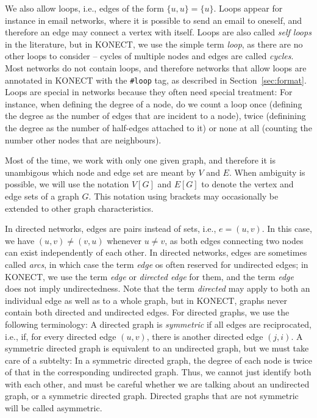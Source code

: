 \documentclass{article}
\begin{document}
We also allow loops, i.e., edges of the form $\{u,u\}=\{u\}$.  Loops
appear for instance in email networks, where it is possible to send an
email to oneself, and therefore an edge may connect a vertex with
itself.  Loops are also called \emph{self loops} in the literature, but
in KONECT, we use the simple term \emph{loop}, as there are no other
loops to consider -- cycles of multiple nodes and edges are called
\emph{cycles}. 
Most networks do not contain loops, and therefore
networks that allow loops are annotated in KONECT with the 
\texttt{\#loop} tag, as described in Section~\ref{sec:format}.  
Loops are special in networks because they often need special treatment:
For instance, when defining the degree of a node, do we count a loop
once (defining the degree as the number of edges that are incident to a
node), twice (definining the degree as the number of half-edges attached
to it) or none at all (counting the number other nodes that are
neighbours).  

Most of the time, we work with only one given graph, and therefore it is
unambigous which node and edge set are meant by $V$ and $E$.  When
ambiguity is possible, we will use the notation
$V[G]$ and $E[G]$ to denote the vertex and edge sets of a graph $G$.
This notation using brackets may occasionally be extended to other graph
characteristics. 

In directed networks, edges are pairs instead of sets, i.e.,
$e=(u,v)$.  In this case, we have $(u,v)\neq(v,u)$ whenever $u \neq v$, 
as both edges connecting two nodes can exist independently of each
other. 
In directed networks, edges are sometimes called
\emph{arcs}, in which case the term \emph{edge} os often reserved for
undirected edges; in KONECT, we use the term \emph{edge} or \emph{directed
  edge} for them, and the term \emph{edge} does not imply
undirectedness.  Note that the term \emph{directed} may apply to both an
individual edge as well as to a whole graph, but in KONECT, graphs never
contain both directed and undirected edges.  
For directed graphs, we use the following terminology:  A directed graph
is \emph{symmetric} if all edges are reciprocated, i.e., if, for every
directed edge $(u,v)$, there is another directed edge $(j,i)$.  A
symmetric directed graph is equivalent to an undirected graph, but we
must take care of a subtelty:  In a symmetric directed graph, the degree
of each node is twice of that in the corresponding undirected graph.
Thus, we cannot just identify both with each other, and must be careful
whether we are talking about an undirected graph, or a symmetric
directed graph.  Directed graphs that are not symmetric will be called
asymmetric. 
\end{document}
